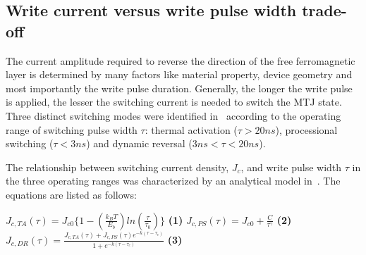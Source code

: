 \subsection{Write current versus write pulse width trade-off} \label{subsec:ict}


The current amplitude required to reverse the direction of the free ferromagnetic layer is determined
by many factors like material property, device geometry and most importantly the write pulse
duration. Generally, the longer the write pulse is applied, the lesser the switching current is
needed to switch the MTJ state. Three distinct switching modes were identified in~\cite{STTRAM:JAP07}
according to the operating range of switching pulse width $\tau$: thermal activation ($\tau>20ns$),
processional switching ($\tau<3ns$) and dynamic reversal ($3ns<\tau<20ns$).

The relationship between switching current density, $J_{c}$, and write pulse width $\tau$ in the
three operating ranges was characterized by an analytical model in~\cite{STTRAM:IEDM09}. The
equations are listed as follows:

 {
 \small{
\noindent $J_{c,TA}(\tau) = J_{c0}\{1- (\frac{k_{B}T}{E_{b}})ln(\frac{\tau}{\tau_{0}})\}$
\hspace{1mm} \textbf{(1)} \hspace{1mm} $J_{c,PS}(\tau) = J_{c0}+ \frac{C}{\tau^{\gamma}}$
\hspace{1mm} \textbf{(2)} \hspace{1mm} $J_{c,DR}(\tau) =
\frac{J_{c,TA}(\tau)+J_{c,PS}(\tau)e^{-k(\tau - \tau_{c})}}{1+e^{-k(\tau - \tau_{c})}}$ \hspace{1mm}
\textbf{(3)}
 }
 }

